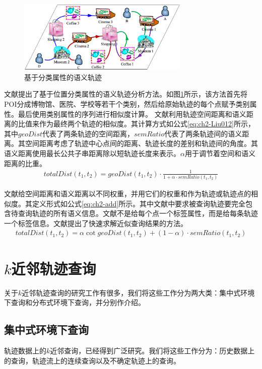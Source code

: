 \begin{figure}
	\centering
	\includegraphics[width=0.73\textwidth]{Fig/chapter2/catagorySementic}
	\caption{基于分类属性的语义轨迹\cite{Xiao}}
	\label{fig-chapter2-category}
\end{figure}
文献\cite{Xiao}提出了基于位置分类属性的语义轨迹分析方法。如图\ref{fig-chapter2-category}所示，该方法首先将POI分成博物馆、医院、学校等若干个类别，然后给原始轨迹的每个点赋予类别属性。最后使用类别属性的序列进行相似度计算。
文献\cite{Liu012}利用轨迹空间距离和语义距离的比值来作为最终两个轨迹的相似度。其计算方式如公式\ref{eq:ch2-Liu012}所示，其中$geoDist$代表了两条轨迹的空间距离，$semRatio$代表了两条轨迹间的语义距离。其空间距离考虑了轨迹中心点间的距离、轨迹长度的差别和轨迹间的角度。其语义距离使用最长公共子串距离除以短轨迹长度来表示。$\alpha$用于调节着空间和语义距离的比重。
\begin{eqnarray}\label{eq:ch2-Liu012}
totalDist(t_{1},t_{2}) =geoDist(t_{1},t_{2})\cdot \frac{1}{1+\alpha \cdot semRatio(t_{1},t_{2})}
\end{eqnarray}

文献\cite{Kaiser,ShangDYXZK12,ZhengYZXSZ15}给空间距离和语义距离以不同权重，并用它们的权重和作为轨迹或轨迹点的相似度。其定义形式如公式\ref{eq:ch2-add}所示。其中文献\cite{Kaiser}中要求被查询轨迹要完全包含待查询轨迹的所有语义信息。文献\cite{ShangDYXZK12}不是给每个点一个标签属性，而是给每条轨迹一个标签信息。文献\cite{ZhengYZXSZ15}提出了快速求解近似查询结果的方法。
\begin{eqnarray}\label{eq:ch2-add}
totalDist(t_{1},t_{2}) = \alpha \cot  geoDist(t_{1},t_{2}) + (1-\alpha) \cdot  semRatio(t_{1},t_{2})
\end{eqnarray}


\section{$k$近邻轨迹查询}\label{sec-c2-topk}
关于$k$近邻轨迹查询的研究工作有很多，我们将这些工作分为两大类：集中式环境下查询和分布式环境下查询，并分别作介绍。

\subsection{集中式环境下查询}
轨迹数据上的$k$近邻查询，已经得到广泛研究。我们将这些工作分为：历史数据上的查询，轨迹流上的连续查询以及不确定轨迹上的查询。

